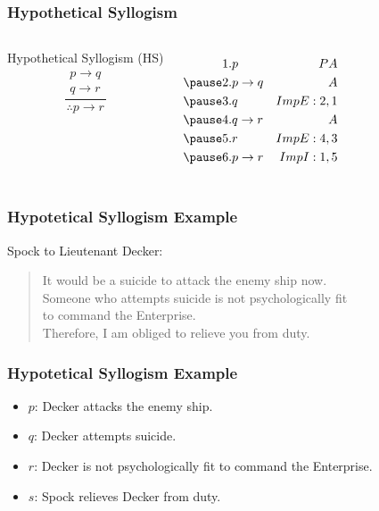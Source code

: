 \documentclass[dvipsnames]{beamer}
\begin{document}
\begin{frame}
  \frametitle{Hypothetical Syllogism}

  \begin{columns}
    \begin{block}{Hypothetical Syllogism (HS)}
      \[
      \frac
        {
          \begin{array}{c}
            p \rightarrow q\\
            q \rightarrow r
          \end{array}}
        {
          \therefore p \rightarrow r
        }
      \]
    \end{block}

    \pause
    \begin{eqnarray*}
      1. & p               & PA\\
      \pause
      2. & p \rightarrow q & A\\
      \pause
      3. & q               & ImpE:2,1\\
      \pause
      4. & q \rightarrow r & A\\
      \pause
      5. & r               & ImpE:4,3\\
      \pause
      6. & p \rightarrow r & ImpI:1,5\\
    \end{eqnarray*}
  \end{columns}
\end{frame}

\begin{frame}
  \frametitle{Hypotetical Syllogism Example}

  \begin{example}
    Spock to Lieutenant Decker:
    \begin{quote}
      It would be a suicide to attack the enemy ship now.\\
      Someone who attempts suicide is not psychologically fit\\
      to command the Enterprise.\\
      Therefore, I am obliged to relieve you from duty.
    \end{quote}
  \end{example}
\end{frame}

\begin{frame}
  \frametitle{Hypotetical Syllogism Example}

  \begin{example}
    \begin{itemize}
      \item $p$: Decker attacks the enemy ship.
      \item $q$: Decker attempts suicide.
      \item $r$: Decker is not psychologically fit to command the Enterprise.
      \item $s$: Spock relieves Decker from duty.
    \end{itemize}
  \end{example}
\end{frame}
\end{document}
